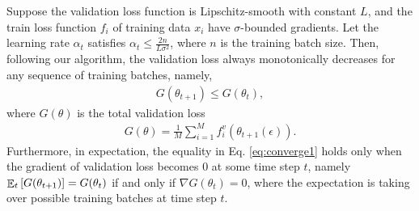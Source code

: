 Suppose the validation loss function is Lipschitz-smooth with constant $L$, and the train loss
function $f_i$ of training data $x_i$ have $\sigma$-bounded gradients. Let the learning rate
$\alpha_t$ satisfies $\alpha_t \leq \frac{2n}{L\sigma^2}$, where $n$ is the training batch size.
Then, following our algorithm, the validation loss always monotonically decreases for any sequence of
training batches, namely,
\begin{align}
\label{eq:converge1}
G(\theta_{t+1}) \leq G(\theta_{t}),
\end{align}
where $G(\theta)$ is the total validation loss
\begin{align}
G(\theta) = \frac{1}{M} \sum_{i=1}^M f^v_i(\theta_{t+1}(\epsilon)).
\end{align}
Furthermore, in expectation, the equality in Eq. \ref{eq:converge1} holds only when the gradient of
validation loss becomes 0 at some time step $t$, namely $\EEsub{G(\theta_{t+1})}{t} = G(\theta_t)$
if and only if $\nabla G(\theta_t) = 0$, where the expectation is taking over possible training
batches at time step $t$.
